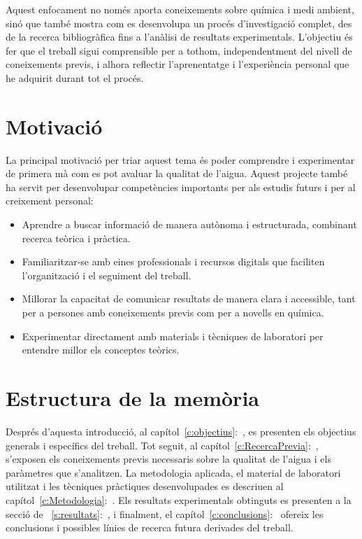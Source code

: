 Aquest enfocament no només aporta coneixements sobre química i medi ambient, sinó que també mostra com es desenvolupa un procés d’investigació complet, des de la recerca bibliogràfica fins a l’anàlisi de resultats experimentals. L’objectiu és fer que el treball sigui comprensible per a tothom, independentment del nivell de coneixements previs, i alhora reflectir l’aprenentatge i l’experiència personal que he adquirit durant tot el procés.

\section{Motivació}

La principal motivació per triar aquest tema és poder comprendre i experimentar de primera mà com es pot avaluar la qualitat de l’aigua. Aquest projecte també ha servit per desenvolupar competències importants per als estudis futurs i per al creixement personal:

\begin{itemize}
    \item Aprendre a buscar informació de manera autònoma i estructurada, combinant recerca teòrica i pràctica.
    \item Familiaritzar-se amb eines professionals i recursos digitals que faciliten l’organització i el seguiment del treball.
    \item Millorar la capacitat de comunicar resultats de manera clara i accessible, tant per a persones amb coneixements previs com per a novells en química.
    \item Experimentar directament amb materials i tècniques de laboratori per entendre millor els conceptes teòrics.
\end{itemize}

\section{Estructura de la memòria}

Després d’aquesta introducció, al capítol~\ref{c:objectius}:~, es presenten els objectius generals i específics del treball. Tot seguit, al capítol~\ref{c:RecercaPrevia}:~, s’exposen els coneixements previs necessaris sobre la qualitat de l’aigua i els paràmetres que s’analitzen. La metodologia aplicada, el material de laboratori utilitzat i les tècniques pràctiques desenvolupades es descriuen al capítol~\ref{c:Metodologia}:~. Els resultats experimentals obtinguts es presenten a la secció de ~\ref{s:resultats}:~, i finalment, el capítol~\ref{c:conclusions}:~ ofereix les conclusions i possibles línies de recerca futura derivades del treball.



